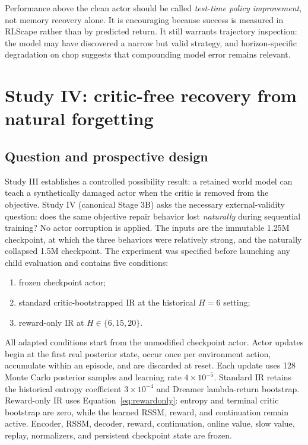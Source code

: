 \documentclass[10pt]{article}
\begin{document}
Performance above the clean actor should be called \emph{test-time policy improvement}, not memory recovery alone. It is encouraging because success is measured in RLScape rather than by predicted return. It still warrants trajectory inspection: the model may have discovered a narrow but valid strategy, and horizon-specific degradation on chop suggests that compounding model error remains relevant.

\section{Study IV: critic-free recovery from natural forgetting}

\subsection{Question and prospective design}

Study III establishes a controlled possibility result: a retained world model can teach a synthetically damaged actor when the critic is removed from the objective. Study IV (canonical Stage 3B) asks the necessary external-validity question: does the same objective repair behavior lost \emph{naturally} during sequential training? No actor corruption is applied. The inputs are the immutable 1.25M checkpoint, at which the three behaviors were relatively strong, and the naturally collapsed 1.5M checkpoint. The experiment was specified before launching any child evaluation and contains five conditions:

\begin{enumerate}
  \item frozen checkpoint actor;
  \item standard critic-bootstrapped IR at the historical $H=6$ setting;
  \item reward-only IR at $H\in\{6,15,20\}$.
\end{enumerate}

All adapted conditions start from the unmodified checkpoint actor. Actor updates begin at the first real posterior state, occur once per environment action, accumulate within an episode, and are discarded at reset. Each update uses 128 Monte Carlo posterior samples and learning rate $4\times10^{-5}$. Standard IR retains the historical entropy coefficient $3\times10^{-4}$ and Dreamer lambda-return bootstrap. Reward-only IR uses Equation~\ref{eq:rewardonly}: entropy and terminal critic bootstrap are zero, while the learned RSSM, reward, and continuation remain active. Encoder, RSSM, decoder, reward, continuation, online value, slow value, replay, normalizers, and persistent checkpoint state are frozen.
\end{document}
